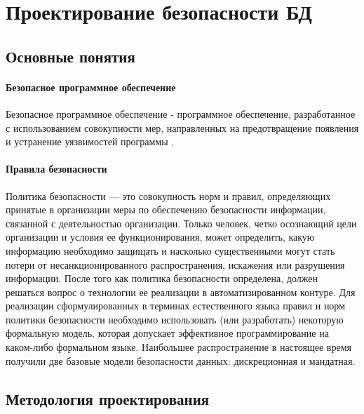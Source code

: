 \section{Проектирование безопасности БД}

\subsection{Основные понятия}

\paragraph{Безопасное программное обеспечение}
Безопасное программное обеспечение - программное обеспечение, разработанное с использованием совокупности
мер, направленных на предотвращение появления и устранение уязвимостей программы \autocite[с. 2]{GOST50939}.

\paragraph{Правила безопасности}
Политика безопасности — это совокупность норм и правил, определяющих принятые в организации меры по
обеспечению безопасности информации, связанной с деятельностью организации. Только человек, четко
осознающий цели организации и условия ее функционирования, может определить, какую информацию
необходимо защищать и насколько существенными могут стать потери от несанкционированного
распространения, искажения или разрушения информации. После того как политика безопасности
определена, должен решаться вопрос о технологии ее реализации в автоматизированном контуре.
Для реализации сформулированных в терминах естественного языка правил и норм политики
безопасности необходимо использовать (или разработать) некоторую формальную модель,
которая допускает эффективное программирование на каком-либо формальном языке.
Наибольшее распространение в настоящее время получили две базовые модели безопасности
данных: дискреционная и мандатная.

\subsection{Методология проектирования}

